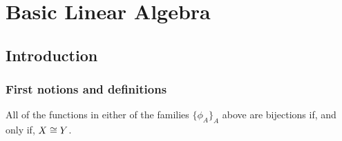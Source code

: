 \chapter{Basic Linear Algebra}
\section{Introduction}
\subsection{First notions and definitions}

\begin{cor}
	All of the functions in either of the families $\{\phi_A\}_A$ above are bijections if, and only if, $X\cong Y$.
\end{cor}